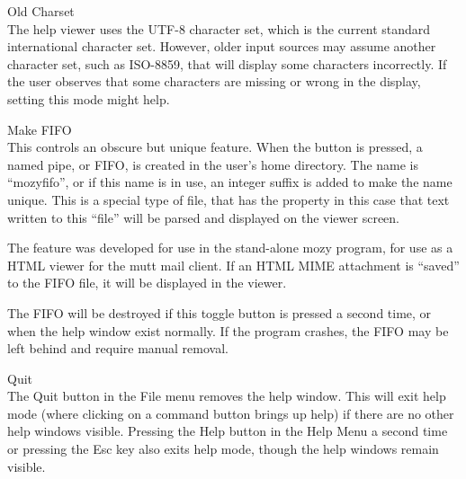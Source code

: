 \begin{description}
\item{\cb Old Charset}\\
The help viewer uses the UTF-8 character set, which is the current
standard international character set.  However, older input sources
may assume another character set, such as ISO-8859, that will display
some characters incorrectly.  If the user observes that some
characters are missing or wrong in the display, setting this mode
might help.

\item{\cb Make FIFO}\\
This controls an obscure but unique feature.  When the button is
pressed, a named pipe, or FIFO, is created in the user's home
directory.  The name is ``{\vt mozyfifo}'', or if this name is in use,
an integer suffix is added to make the name unique.  This is a special
type of file, that has the property in this case that text written to
this ``file'' will be parsed and displayed on the viewer screen.

The feature was developed for use in the stand-alone {\vt mozy}
program, for use as a HTML viewer for the {\vt mutt} mail client.  If
an HTML MIME attachment is ``saved'' to the FIFO file, it will be
displayed in the viewer.

The FIFO will be destroyed if this toggle button is pressed a second
time, or when the help window exist normally.  If the program crashes,
the FIFO may be left behind and require manual removal.

\item{\cb Quit}\\
The {\cb Quit} button in the {\cb File} menu removes the help window. 
This will exit help mode (where clicking on a command button brings up
help) if there are no other help windows visible.  Pressing the {\cb
Help} button in the {\cb Help Menu} a second time or pressing the {\kb
Esc} key also exits help mode, though the help windows remain visible.
\end{description}


